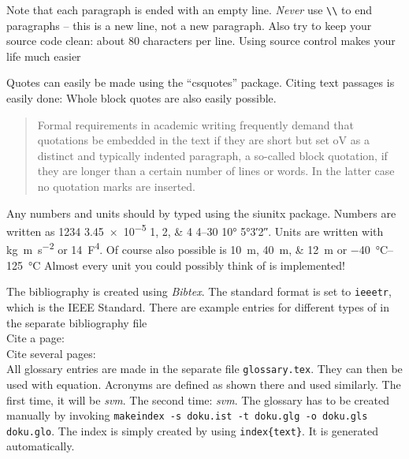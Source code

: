 %
Note that each paragraph is ended with an empty line.
\emph{Never} use \verb|\\| to end paragraphs -- this is a new line, not a new paragraph.
Also try to keep your source code clean: about 80 characters per line.
Using source control makes your life much easier

%
Quotes can easily be made using the \enquote{csquotes} package.
Citing text passages is easily done:  Whole block quotes are also easily
possible.

\blockquote{Formal requirements in academic writing frequently demand that
    quotations be embedded in the text if they are short but set oV as a distinct
    and typically indented paragraph, a so-called block quotation, if they are
    longer than a certain number of lines or words. In the latter case no quotation
    marks are inserted.}

%
Any numbers and units should by typed using the siunitx package.
Numbers are written as \num{1234} \num{3.45e-5} \numlist{1;2;4} \numrange{4}{30} \ang{10} \ang{5;3;2}.
Units are written with \si{\kilo\gram\meter\per\square\second} or \SI{14}{\farad\tothe{4}}.
Of course also possible is \SIlist{10;40;12}{\meter} or \SIrange{-40}{+125}{\degreeCelsius}
Almost every unit you could possibly think of is implemented!

%
The bibliography is created using \emph{Bibtex}. The
standard format is set to \texttt{ieeetr}, which is the IEEE Standard. There
are example entries for different types of  in the separate bibliography file
\cite{incollection} \cite{manual} \\


Cite a page: \cite[p. 435]{incollection} \\
Cite several pages: \cite[pp. 436-440]{incollection}\\

%
All glossary entries are made in the separate file \texttt{glossary.tex}.
They can then be used with \gls{equation}.
Acronyms are defined as shown there and used similarly.
The first time, it will be \emph{\gls{svm}}.
The second time: \emph{\gls{svm}}.
The glossary has to be created manually by invoking \texttt{makeindex -s doku.ist -t doku.glg -o doku.gls doku.glo}.
The index is simply created by using \texttt{index\{text\}}. It is generated automatically.

